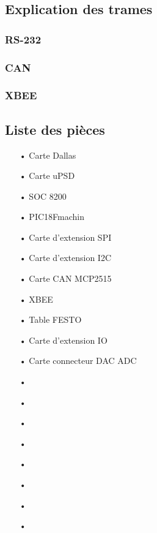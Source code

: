 \documentclass[10pt,a4paper,final]{article}
\begin{document}
\begin{spacing}{1.5}
\subsection{Explication des trames}
\subsubsection{RS-232}

\subsubsection{CAN}

\subsubsection{XBEE}




\subsection{Liste des pièces}
\begin{center}
\HRule
\end{center}
\begin{multicols}{3}
\begin{itemize}
\item[•]Carte Dallas
\item[•]Carte uPSD
\item[•]SOC 8200
\item[•]PIC18Fmachin
\item[•]Carte d'extension SPI
\item[•]Carte d'extension I2C
\item[•]Carte CAN MCP2515
\item[•]XBEE
\item[•]Table FESTO
\item[•]Carte d'extension IO
\item[•]Carte connecteur DAC ADC
\item[•]
\item[•]
\item[•]
\item[•]
\item[•]
\item[•]
\item[•]
\item[•]
\end{itemize}
\end{multicols}
\begin{center}
\HRule
\end{center}



\end{spacing}
\end{document}

